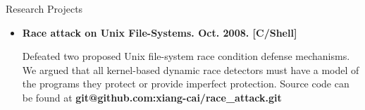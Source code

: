\documentclass[11pt,oneside]{article}
\newenvironment{ressection}[1]{
	\vspace{4pt}
	{\fontfamily{phv}\selectfont\Large#1}
	\begin{itemize}
	\vspace{3pt}
}{
	\end{itemize}
}
\newcommand{\resitem}[1]{
	\vspace{-4pt}
	\item \begin{flushleft} #1 \end{flushleft}
}
\begin{document}
\begin{ressection}{Research Projects}
{\begin{small}
		Proposed and implemented an
					easy-to-use, portable, provably-secure system for
					accessing UNIX file-systems without race conditions
					and that supported arbitrary sequences of operations
					within each pseudo-transaction and which had
					negligible overhead on a mail-server
					benchmark. Source code can be found at \textbf{git@github.com:xiang-cai/trace.git}
		\end{small}
	}
	
	\resitem{\textbf{Race attack on Unix File-Systems. Oct. 2008. [C/Shell]}
		\begin{small}
		
		Defeated two proposed Unix file-system race
			condition defense mechanisms. We argued that all
			kernel-based dynamic race detectors must have a model of
			the programs they protect or provide imperfect
			protection. Source code can be found at \textbf{git@github.com:xiang-cai/race\_attack.git}
		\end{small}
	} 



\end{ressection}
\end{document}
